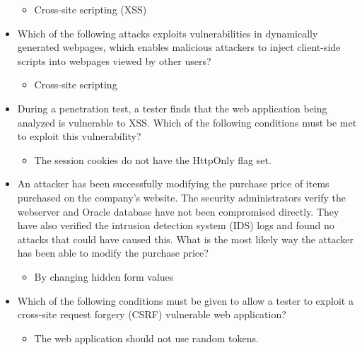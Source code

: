 \begin{itemize}
    \begin{itemize}
        \item Cross-site scripting (XSS)
    \end{itemize}
    \item Which of the following attacks exploits vulnerabilities in dynamically generated webpages, which enables malicious attackers to inject client-side scripts into webpages viewed by other users?
    \begin{itemize}
        \item Cross-site scripting
    \end{itemize}
    \item During a penetration test, a tester finds that the web application being analyzed is vulnerable to XSS. Which of the following conditions must be met to exploit this vulnerability?
    \begin{itemize}
        \item The session cookies do not have the HttpOnly flag set.
    \end{itemize}
    \item An attacker has been successfully modifying the purchase price of items purchased on the company's website. The security administrators verify the webserver and Oracle database have not been compromised directly. They have also verified the intrusion detection system (IDS) logs and found no attacks that could have caused this. What is the most likely way the attacker has been able to modify the purchase price?
    \begin{itemize}
        \item By changing hidden form values
    \end{itemize}
    \item Which of the following conditions must be given to allow a tester to exploit a cross-site request forgery (CSRF) vulnerable web application?
    \begin{itemize}
        \item The web application should not use random tokens.
    \end{itemize}
\end{itemize}
